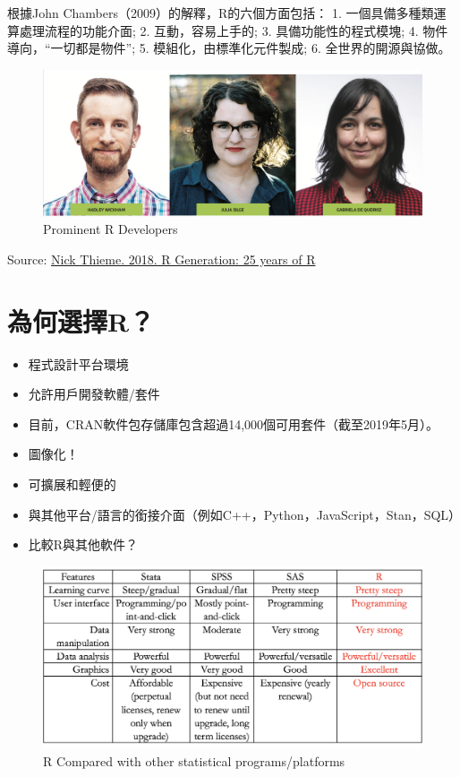 \documentclass[]{book}
\providecommand{\tightlist}{%
  \setlength{\itemsep}{0pt}\setlength{\parskip}{0pt}}
\begin{document}
根據John Chambers（2009）的解釋，R的六個方面包括：
1. 一個具備多種類運算處理流程的功能介面;
2. 互動，容易上手的;
3. 具備功能性的程式模塊;
4. 物件導向，``一切都是物件'';
5. 模組化，由標準化元件製成;
6. 全世界的開源與協做。

\begin{figure}
\includegraphics[width=1\linewidth]{Rdevelopers} \caption{Prominent R Developers}\label{fig:Rdevelopers}
\end{figure}

Source: \href{https://rss.onlinelibrary.wiley.com/doi/10.1111/j.1740-9713.2018.01169.x}{Nick Thieme. 2018. R Generation: 25 years of R}

\hypertarget{r-3}{%
\section{為何選擇R？}\label{r-3}}

\begin{itemize}
\tightlist
\item
  程式設計平台環境
\item
  允許用戶開發軟體/套件
\item
  目前，CRAN軟件包存儲庫包含超過14,000個可用套件（截至2019年5月）。
\item
  圖像化！
\item
  可擴展和輕便的
\item
  與其他平台/語言的銜接介面（例如C++，Python，JavaScript，Stan，SQL）
\item
  比較R與其他軟件？
\end{itemize}

\begin{figure}
\includegraphics[width=1\linewidth]{Rcompare} \caption{R Compared with other statistical programs/platforms}\label{fig:Rcompare}
\end{figure}
\end{document}
